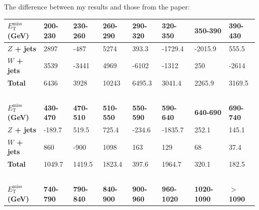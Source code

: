 The difference between my results and those from the paper:

\begin{table}[H]
\centering
    \begin{tabular}{|l|lllllll|}
    \hline
    
    \textbf{$E_{\mathrm{T}}^{\mathrm{miss}}$ (GeV)}       & \textbf{200-230} & \textbf{230-260} & \textbf{260-290}  & \textbf{290-320} & \textbf{320-350}  & \textbf{350-390}  & \textbf{390-430} \\ \hline
    
    \textbf{$Z$ + jets} & 2897   & -487   & 5274    & 393.3   & -1729.4     & -2015.9      & 555.5    \\ \hline
    \textbf{$W$ + jets} & 3539   & -3441   & 4969    & -6102    & -1312     & 250      & -2614    \\ \hline
    \textbf{Total}        & 6436  & 3928   & 10243    & 6495.3 & 3041.4  & 2265.9    & 3169.5  \\ \hline
    
    ~            & ~       & ~       & ~        & ~       & ~        & ~         & ~       \\ \hline
    
    \textbf{$E_{\mathrm{T}}^{\mathrm{miss}}$ (GeV)}      & \textbf{430-470} & \textbf{470-510} & \textbf{510-550}  & \textbf{550-590} & \textbf{590-640}  & \textbf{640-690}   & \textbf{690-740} \\ \hline
    
    \textbf{$Z$ + jets}  & -189.7    & 519.5    & 725.4      & -234.6    & -1835.7      & 252.1       & 145.1     \\ \hline
    \textbf{$W$ + jets} & 860     & -900     & 1098      & 163     & 129      & 68        & 37.4    \\ \hline
    \textbf{Total}       & 1049.7  & 1419.5  & 1823.4 & 397.6 & 1964.7  & 320.1   & 182.5 \\ \hline
    
    ~            & ~       & ~       & ~        & ~       & ~        & ~         & ~       \\ \hline
    
    \textbf{$E_{\mathrm{T}}^{\mathrm{miss}}$ (GeV)}      & \textbf{740-790} & \textbf{790-840} & \textbf{840-900}  & \textbf{900-960} & \textbf{960-1020} & \textbf{1020-1090} & \textbf{$>$1090}   \\ \hline
    

\end{tabular}
\end{table}
